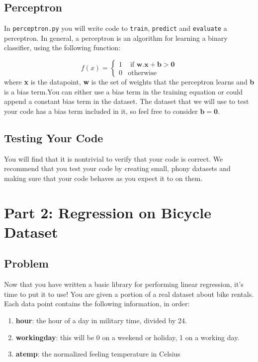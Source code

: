 \documentclass{article}
\begin{document}
\subsection{Perceptron}
In \verb|perceptron.py| you will write code to \verb|train|, \verb|predict| and \verb|evaluate| a perceptron. In general, a perceptron is an algorithm for learning a binary classifier, using the following function:

\[ f(x) = \begin{cases} 
      1 & \text{ if } \bm{w.x + b > 0} \\
      0 & \text{otherwise}
   \end{cases}
\]
where \textbf{x} is the datapoint, \textbf{w} is the set of weights that the perceptron learns and \textbf{b} is a bias term.You can either use a bias term in the training equation or could append a constant bias term in the dataset. The dataset that we will use to test your code has a bias term included in it, so feel free to consider $\bm{b = 0}$.


\subsection{Testing Your Code}
You will find that it is nontrivial to verify that your code is correct.
We recommend that you test your code by creating small, phony datasets and making sure that your code behaves as you expect it to on them. ~\\

\section{Part 2: Regression on Bicycle Dataset}
\subsection{Problem}
Now that you have written a basic library for performing linear regression, it's time to put it to use!
You are given a portion of a real dataset about bike rentals.
Each data point contains the following information, in order:

\begin{enumerate}
\item \textbf{hour}: the hour of a day in military time, divided by 24.
\item \textbf{workingday}: this will be 0 on a weekend or holiday, 1 on a working day.
\item \textbf{atemp}: the normalized feeling temperature in Celsius
\end{enumerate}
\end{document}

